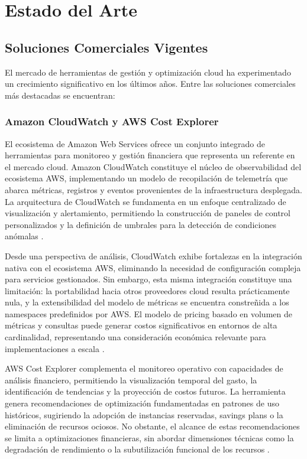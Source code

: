 \chapter{Estado del Arte}

\section{Soluciones Comerciales Vigentes}

El mercado de herramientas de gestión y optimización cloud ha experimentado un crecimiento significativo en los últimos años. Entre las soluciones comerciales más destacadas se encuentran:

\subsection{Amazon CloudWatch y AWS Cost Explorer}

El ecosistema de Amazon Web Services ofrece un conjunto integrado de herramientas para monitoreo y gestión financiera que representa un referente en el mercado cloud. Amazon CloudWatch constituye el núcleo de observabilidad del ecosistema AWS, implementando un modelo de recopilación de telemetría que abarca métricas, registros y eventos provenientes de la infraestructura desplegada. La arquitectura de CloudWatch se fundamenta en un enfoque centralizado de visualización y alertamiento, permitiendo la construcción de paneles de control personalizados y la definición de umbrales para la detección de condiciones anómalas \parencite{AWS2026}.

Desde una perspectiva de análisis, CloudWatch exhibe fortalezas en la integración nativa con el ecosistema AWS, eliminando la necesidad de configuración compleja para servicios gestionados. Sin embargo, esta misma integración constituye una limitación: la portabilidad hacia otros proveedores cloud resulta prácticamente nula, y la extensibilidad del modelo de métricas se encuentra constreñida a los namespaces predefinidos por AWS. El modelo de pricing basado en volumen de métricas y consultas puede generar costos significativos en entornos de alta cardinalidad, representando una consideración económica relevante para implementaciones a escala \parencite{AWS2026}.

AWS Cost Explorer complementa el monitoreo operativo con capacidades de análisis financiero, permitiendo la visualización temporal del gasto, la identificación de tendencias y la proyección de costos futuros. La herramienta genera recomendaciones de optimización fundamentadas en patrones de uso históricos, sugiriendo la adopción de instancias reservadas, savings plans o la eliminación de recursos ociosos. No obstante, el alcance de estas recomendaciones se limita a optimizaciones financieras, sin abordar dimensiones técnicas como la degradación de rendimiento o la subutilización funcional de los recursos \parencite{AWS2026}.

